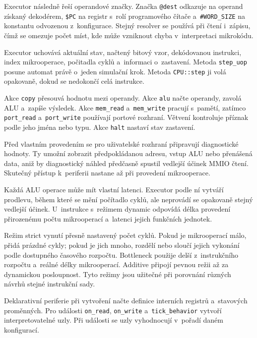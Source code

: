 \documentclass[hidelinks, 12pt]{article}%
\begin{document}
Executor následně řeší operandové značky. Značka \texttt{@dest} odkazuje na operand získaný dekodérem, \texttt{\$PC} na registr s~rolí programového čítače a~\texttt{\#WORD\_SIZE} na konstantu odvozenou z~konfigurace. Stejný resolver se používá při čtení i~zápisu, čímž se omezuje počet míst, kde může vzniknout chyba v~interpretaci mikrokódu.

Executor uchovává aktuální stav, načtený bitový vzor, dekódovanou instrukci, index mikrooperace, počitadla cyklů a~informaci o~zastavení. Metoda \texttt{step\_uop} posune automat právě o~jeden simulační krok. Metoda \texttt{CPU::step} ji volá opakovaně, dokud se nedokončí celá instrukce.

Akce \texttt{copy} přesouvá hodnotu mezi operandy. Akce \texttt{alu} načte operandy, zavolá ALU a~zapíše výsledek. Akce \texttt{mem\_read} a~\texttt{mem\_write} pracují s~pamětí, zatímco \texttt{port\_read} a~\texttt{port\_write} používají portové rozhraní. Větvení kontroluje příznak podle jeho jména nebo typu. Akce \texttt{halt} nastaví stav zastavení.

Před vlastním provedením se pro uživatelské rozhraní připravují diagnostické hodnoty. Ty umožní zobrazit předpokládanou adresu, vstup ALU nebo přenášená data, aniž by diagnostický náhled předčasně spustil vedlejší účinek MMIO čtení. Skutečný přístup k~periferii nastane až při provedení mikrooperace.

Každá ALU operace může mít vlastní latenci. Executor podle ní vytváří prodlevu, během které se mění počítadlo cyklů, ale neprovádí se opakovaně stejný vedlejší účinek. U~instrukce s~režimem dynamic odpovídá délka provedení přirozenému počtu mikrooperací a~latenci jejich funkčních jednotek.

Režim strict vynutí přesně nastavený počet cyklů. Pokud je mikrooperací málo, přidá prázdné cykly; pokud je jich mnoho, rozdělí nebo sloučí jejich vykonání podle dostupného časového rozpočtu. Bottleneck použije delší z~instrukčního rozpočtu a~reálné délky mikrooperací. Additive připojí pevnou režii až za dynamickou posloupnost. Tyto režimy jsou užitečné při porovnání různých návrhů stejné instrukční sady.

Deklarativní periferie při vytvoření načte definice interních registrů a~stavových proměnných. Pro události \texttt{on\_read}, \texttt{on\_write} a~\texttt{tick\_behavior} vytvoří interpretovatelné uzly. Při události se uzly vyhodnocují v~pořadí daném konfigurací.
\end{document}
